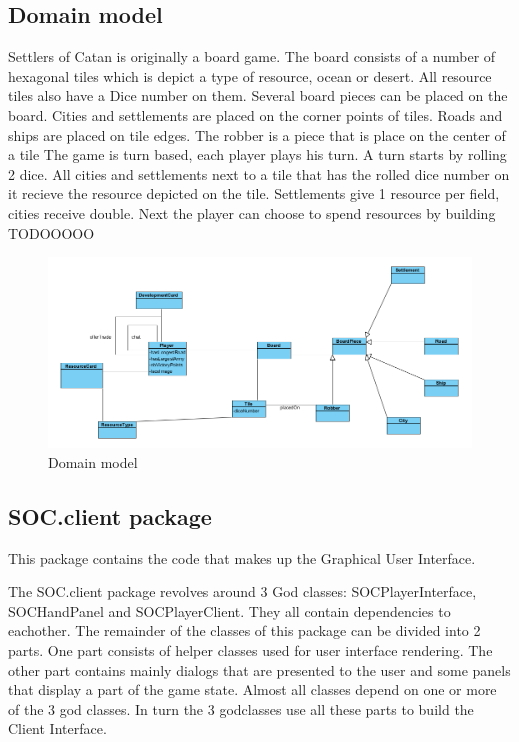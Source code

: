 \documentclass[pdftex12pt, a4paper]{article}
\begin{document}
\subsection{Domain model}
Settlers of Catan is originally a board game. 
The board consists of a number of hexagonal tiles which is depict a type of resource, ocean or desert. 
All resource tiles also have a Dice number on them. Several board pieces can be placed on the board. 
Cities and settlements are placed on the corner points of tiles. 
Roads and ships are placed on tile edges.
The robber is a piece that is place on the center of a tile
The game is turn based, each player plays his turn. 
A turn starts by rolling 2 dice. All cities and settlements next to a tile that has the rolled dice number on it recieve the resource depicted on the tile. Settlements give 1 resource per field, cities receive double.
Next the player can choose to spend resources by building TODOOOOO

\begin{figure}
\begin{center}
\includegraphics[width=1\textwidth]{Image/Ontwerp/DomainModel.png}
\caption{Domain model}
\label{fig:empty}
\end{center}
\end{figure}

\subsection{SOC.client package}
This package contains the code that makes up the Graphical User Interface.

The SOC.client package revolves around 3 God classes: SOCPlayerInterface, SOCHandPanel and SOCPlayerClient. 
They all contain dependencies to eachother. 
The remainder of the classes of this package can be divided into 2 parts. 
One part consists of helper classes used for user interface rendering. 
The other part contains mainly dialogs that are presented to the user and some panels that display a part of the game state. 
Almost all classes depend on one or more of the 3 god classes. 
In turn the 3 godclasses use all these parts to build the Client Interface.
\end{document}
